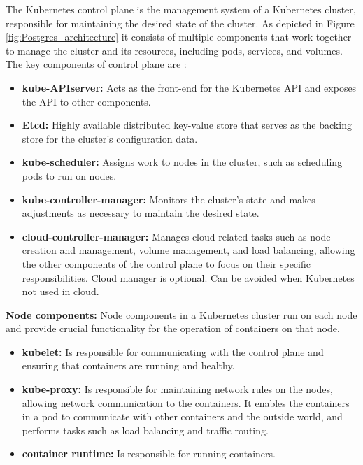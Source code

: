 The Kubernetes control plane is the management system of a Kubernetes cluster, responsible for maintaining the desired state of the cluster.
As depicted in Figure \ref{fig:Postgres_architecture} it consists of multiple components that work together to manage the cluster and its resources, including pods, services, and volumes. The key components of control plane are \cite{masteringKubernetesConcepts}:
\begin{itemize}
    \item \textbf{kube-APIserver:} Acts as the front-end for the Kubernetes API and exposes the API to other components. \cite{docuKubeComponents}
    \item \textbf{Etcd:} Highly available distributed key-value store that serves as the backing store for the cluster's configuration data. \cite{Dobies2020}
    \item \textbf{kube-scheduler:} Assigns work to nodes in the cluster, such as scheduling pods to run on nodes. \cite{kubeUpAndRunningPods}
    \item \textbf{kube-controller-manager:} Monitors the cluster's state and makes adjustments as necessary to maintain the desired state. \cite{masteringKubernetesConcepts}
    \item \textbf{cloud-controller-manager:} Manages cloud-related tasks such as node creation and management, volume management, and load balancing, allowing the other components of the control plane to focus on their specific responsibilities. Cloud manager is optional. Can be avoided when Kubernetes not used in cloud. \cite{docuKubeComponents}
\end{itemize}
\textbf{Node components:}
Node components in a Kubernetes cluster run on each node and provide crucial functionality for the operation of containers on that node. \cite{docuKubeComponents}
\begin{itemize}
    \item \textbf{kubelet:} Is responsible for communicating with the control plane and ensuring that containers are running and healthy. \cite{kubeUpAndRunning}
    \item \textbf{kube-proxy:} Is responsible for maintaining network rules on the nodes, allowing network communication to the containers. It enables the containers in a pod to communicate with other containers and the outside world, and performs tasks such as load balancing and traffic routing. \cite{kubeUpAndRunning}
    \item \textbf{container runtime:} Is responsible for running containers. \cite{docuKubeComponents}
\end{itemize}

